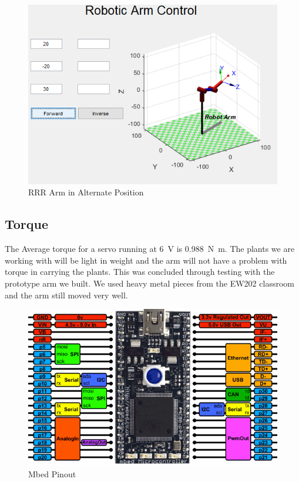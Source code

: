 \begin{figure}
\begin{center}
\includegraphics[width=0.8\columnwidth]{figures/robotarm2.png}
\end{center}
\caption{RRR Arm in Alternate Position}
\label{fig:robotarm2}
\end{figure}

\subsection{Torque}
The Average torque for a servo running at \SI{6}{\volt} is \SI{0.988}{\newton\meter}. The plants we are working with will be light in weight and the arm will not have a problem with torque in carrying the plants. This was concluded through testing with the prototype arm we built. We used heavy metal pieces from the EW202 classroom and the arm still moved very well.

\begin{figure}
\begin{center}
\includegraphics[width=\columnwidth]{figures/robotarm3.png}
\end{center}
\caption{Mbed Pinout}
\label{fig:robotarm3}
\end{figure}

